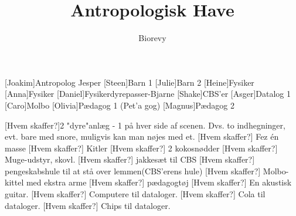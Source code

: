 \documentclass[a4paper,12pt]{article}
\title{Antropologisk Have}
\author{Biorevy}
\begin{document}
\maketitle




\begin{roles}
	[Joakim]Antropolog Jesper
	[Steen]Barn 1
	[Julie]Barn 2
	[Heine]Fysiker
	[Anna]Fysiker
	[Daniel]Fysikerdyrepasser-Bjarne
	[Shake]CBS'er
	[Asger]Datalog 1
	[Caro]Molbo
	[Olivia]Pædagog 1 (Pet'a gog)
	[Magnus]Pædagog 2
\end{roles}


\begin{props}
	[Hvem skaffer?]2 "dyre"anlæg - 1 på hver side af scenen. Dvs. to indhegninger, evt. bare med snore, muligvis kan man nøjes med et.
	[Hvem skaffer?] Fez én masse
	[Hvem skaffer?] Kitler
	[Hvem skaffer?] 2 kokosnødder
	[Hvem skaffer?] Muge-udstyr, skovl.
	[Hvem skaffer?] jakkesæt til CBS
	[Hvem skaffer?] pengeskabshule til at stå over lemmen(CBS'erens hule)
	[Hvem skaffer?] Molbo-kittel med ekstra arme
	[Hvem skaffer?] pædagogtøj
	[Hvem skaffer?] En akustisk guitar.
	[Hvem skaffer?] Computere til dataloger.
	[Hvem skaffer?] Cola til dataloger.
	[Hvem skaffer?] Chips til dataloger.
\end{props}
\end{document}
